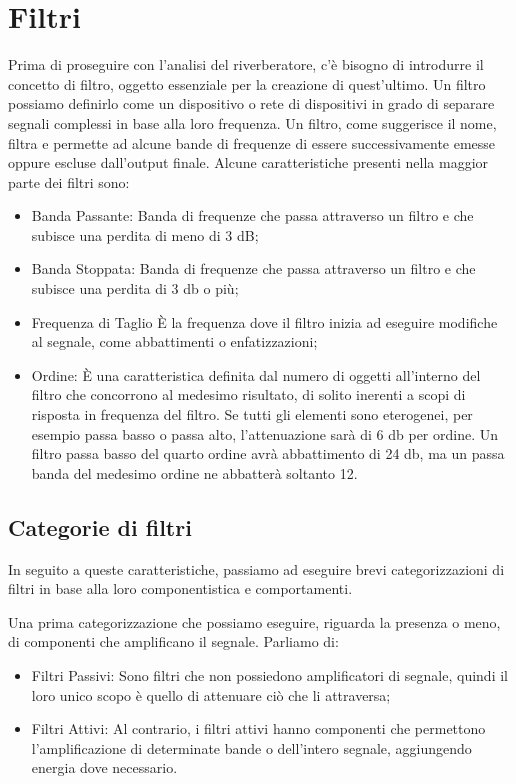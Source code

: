 %

\section{Filtri}
Prima di proseguire con l’analisi del riverberatore, c’è bisogno di introdurre il concetto di filtro, oggetto essenziale  per la creazione di quest’ultimo.
Un filtro possiamo definirlo come un dispositivo o rete di dispositivi in grado di separare segnali complessi in base alla loro frequenza. Un filtro, come suggerisce il nome, filtra e permette ad alcune bande di frequenze di essere successivamente emesse oppure escluse dall’output finale.
Alcune caratteristiche presenti nella maggior parte dei filtri sono:
\begin{itemize}
\item Banda Passante:
Banda di frequenze che passa attraverso un filtro e che subisce una perdita di meno di 3 dB;
\item Banda Stoppata:
Banda di frequenze che passa attraverso un filtro e che subisce una perdita di 3 db o più;
\item Frequenza di Taglio
È la frequenza dove il filtro inizia ad eseguire modifiche al segnale, come abbattimenti o enfatizzazioni;
\item Ordine:
È una caratteristica definita dal numero di oggetti all’interno del filtro che concorrono al medesimo risultato, di solito inerenti a scopi di risposta in frequenza del filtro. Se tutti gli elementi sono eterogenei, per esempio passa basso o passa alto, l’attenuazione sarà di 6 db per ordine. Un filtro passa basso del quarto ordine avrà abbattimento di 24 db, ma un passa banda del medesimo ordine ne abbatterà soltanto 12.
\end{itemize}
\medskip
\subsection{Categorie di filtri}
In seguito a queste caratteristiche, passiamo ad eseguire brevi categorizzazioni di filtri in base alla loro componentistica e comportamenti.

Una prima categorizzazione che possiamo eseguire, riguarda la presenza o meno, di componenti che amplificano il segnale. Parliamo di:
\begin{itemize}
\item Filtri Passivi:
Sono filtri che non possiedono amplificatori di segnale, quindi il loro unico scopo è quello di attenuare ciò che li attraversa;
\item Filtri Attivi:
Al contrario, i filtri attivi hanno componenti che permettono l’amplificazione di determinate bande o dell’intero segnale, aggiungendo energia dove necessario.
\end{itemize}

